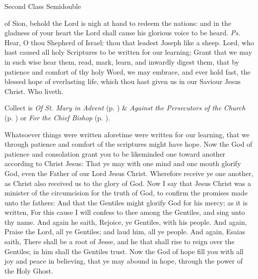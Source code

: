 \begin{inhead}
{Second Class Semidouble}
\end{inhead}

\properantiphonfix

\introit
{} of Sion, behold the Lord is nigh at hand to redeem the nations: and in the gladness of your heart the Lord shall cause his glorious voice to be heard. \textit{Ps.} Hear, O thou Shepherd of Israel: thou that leadest Joseph like a sheep.
\collect
{} Lord, who hast caused all holy Scriptures to be written for our learning; Grant that we may in such wise hear them, read, mark, learn, and inwardly digest them, that by patience and comfort of thy holy Word, we may embrace, and ever hold fast, the blessed hope of everlasting life, which thou hast given us in our Saviour Jesus Christ. Who liveth.
\begin{rubric}
     Collect is \emph{Of St. Mary in Advent} (p. \pageref{SPMaryInAdvent}) \&  \emph{Against the Persecutors of the Church} (p. \pageref{SPAgainst}) or \emph{For the Chief Bishop} (p. \pageref{SPChiefBishop}).
\end{rubric}
 Whatsoever things were written aforetime were written for our learning, that we through patience and comfort of the scriptures might have hope. Now the God of patience and consolation grant you to be likeminded one toward another according to Christ Jesus: That ye may with one mind and one mouth glorify God, even the Father of our Lord Jesus Christ. Wherefore receive ye one another, as Christ also received us to the glory of God. Now I say that Jesus Christ was a minister of the circumcision for the truth of God, to confirm the promises made unto the fathers: And that the Gentiles might glorify God for his mercy; as it is written, For this cause I will confess to thee among the Gentiles, and sing unto thy name. And again he saith, Rejoice, ye Gentiles, with his people. And again, Praise the Lord, all ye Gentiles; and laud him, all ye people. And again, Esaias saith, There shall be a root of Jesse, and he that shall rise to reign over the Gentiles; in him shall the Gentiles trust. Now the God of hope fill you with all joy and peace in believing, that ye may abound in hope, through the power of the Holy Ghost.


